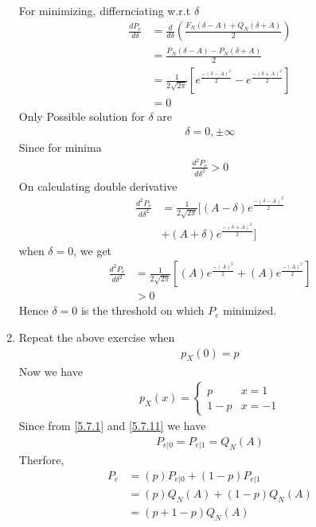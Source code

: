 \documentclass[journal,12pt,twocolumn]{IEEEtran}
\renewcommand\thesection{\arabic{section}}
\begin{document}
\begin{enumerate}[label=\thesection.\arabic*.,ref=\thesection.\theenumi]
\begin{align}
\end{align}
For minimizing, differnciating w.r.t $\delta$
\begin{align}
    \frac{d P_e}{d\delta} &= \frac{d}{d\delta}\left(\frac{F_N(\delta-A)+Q_N(\delta+A)}{2}\right)\\
    &=\frac{P_N(\delta-A)-P_N(\delta+A)}{2}\\
    &=\frac{1}{2\sqrt{2\pi}}\left[e^{\frac{-(\delta-A)^2}{2}}-e^{\frac{-(\delta+A)^2}{2}}\right]\\
    &=0
\end{align}
Only Possible solution for $\delta $ are
\begin{align}
    \delta=0,\pm \infty
\end{align}
Since for minima \\
\begin{align}
    \frac{d^2P_e}{d\delta ^2} >0
\end{align}
On calculating double derivative
\begin{align}
    \frac{d^2P_e}{d\delta ^2} &= \frac{1}{2\sqrt{2\pi}}[(A-\delta)e^{\frac{-(\delta-A)^2}{2}}\\
     &+(A+\delta)e^{\frac{-(\delta+A)^2}{2}}]
\end{align}
when $\delta =0$, we get
\begin{align}
    \frac{d^2P_e}{d\delta ^2} &= \frac{1}{2\sqrt{2\pi}}[(A)e^{\frac{-(A)^2}{2}}+(A)e^{\frac{-(A)^2}{2}}] \\
    &>0
\end{align}
Hence $\delta=0$ is the threshold on which $P_e$ minimized.
\item Repeat the above exercise when
\begin{align} p_X(0) = p \end{align}
\solution Now we have 
\begin{align}
    p_X(x) = \begin{cases}
        p & x = 1 \\
        1-p & x= -1
    \end{cases}
\end{align}
Since from \eqref{5.7.1} and \eqref{5.7.11}
we have
\begin{align}
    P_{e|0}=P_{e|1} = Q_N(A)
\end{align}
Therfore,\\
\begin{align}
    P_e &= (p)P_{e|0}+(1-p)P_{e|1} \\
    &= (p)Q_N(A)+(1-p)Q_N(A)\\
    &=(p+1-p)Q_N(A)\\

\end{align}
\end{enumerate}
\end{document}
